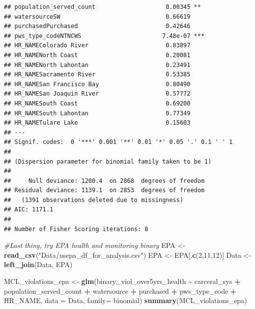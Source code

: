 \documentclass[
]{article}
\newenvironment{Shaded}{\begin{snugshade}}{\end{snugshade}}
\newcommand{\AttributeTok}[1]{\textcolor[rgb]{0.13,0.29,0.53}{#1}}
\newcommand{\CommentTok}[1]{\textcolor[rgb]{0.56,0.35,0.01}{\textit{#1}}}
\newcommand{\DecValTok}[1]{\textcolor[rgb]{0.00,0.00,0.81}{#1}}
\newcommand{\FunctionTok}[1]{\textcolor[rgb]{0.13,0.29,0.53}{\textbf{#1}}}
\newcommand{\NormalTok}[1]{#1}
\newcommand{\OtherTok}[1]{\textcolor[rgb]{0.56,0.35,0.01}{#1}}
\newcommand{\SpecialCharTok}[1]{\textcolor[rgb]{0.81,0.36,0.00}{\textbf{#1}}}
\newcommand{\StringTok}[1]{\textcolor[rgb]{0.31,0.60,0.02}{#1}}
\begin{document}
\begin{verbatim}
## population_served_count                    0.00345 ** 
## watersourceSW                              0.66619    
## purchasedPurchased                         0.42646    
## pws_type_codeNTNCWS                       7.48e-07 ***
## HR_NAMEColorado River                      0.83897    
## HR_NAMENorth Coast                         0.20081    
## HR_NAMENorth Lahontan                      0.23491    
## HR_NAMESacramento River                    0.53385    
## HR_NAMESan Francisco Bay                   0.80490    
## HR_NAMESan Joaquin River                   0.57772    
## HR_NAMESouth Coast                         0.69200    
## HR_NAMESouth Lahontan                      0.77349    
## HR_NAMETulare Lake                         0.15603    
## ---
## Signif. codes:  0 '***' 0.001 '**' 0.01 '*' 0.05 '.' 0.1 ' ' 1
## 
## (Dispersion parameter for binomial family taken to be 1)
## 
##     Null deviance: 1200.4  on 2868  degrees of freedom
## Residual deviance: 1139.1  on 2853  degrees of freedom
##   (1391 observations deleted due to missingness)
## AIC: 1171.1
## 
## Number of Fisher Scoring iterations: 8
\end{verbatim}

\begin{Shaded}
\begin{Highlighting}[]
\CommentTok{\#Last thing, try EPA health and monitoring binary}
\NormalTok{EPA }\OtherTok{\textless{}{-}} \FunctionTok{read\_csv}\NormalTok{(}\StringTok{"Data/usepa\_df\_for\_analysis.csv"}\NormalTok{)}
\NormalTok{EPA }\OtherTok{\textless{}{-}}\NormalTok{ EPA[,}\FunctionTok{c}\NormalTok{(}\DecValTok{2}\NormalTok{,}\DecValTok{11}\NormalTok{,}\DecValTok{12}\NormalTok{)]}
\NormalTok{Data }\OtherTok{\textless{}{-}} \FunctionTok{left\_join}\NormalTok{(Data, EPA)}

\NormalTok{MCL\_violations\_epa }\OtherTok{\textless{}{-}} \FunctionTok{glm}\NormalTok{(binary\_viol\_over5yrs\_health }\SpecialCharTok{\textasciitilde{}}\NormalTok{ carceral\_sys }\SpecialCharTok{+}\NormalTok{ population\_served\_count }\SpecialCharTok{+}\NormalTok{ watersource }\SpecialCharTok{+}\NormalTok{ purchased }\SpecialCharTok{+}\NormalTok{ pws\_type\_code }\SpecialCharTok{+}\NormalTok{ HR\_NAME, }\AttributeTok{data =}\NormalTok{ Data, }\AttributeTok{family=}\NormalTok{ binomial)}
\FunctionTok{summary}\NormalTok{(MCL\_violations\_epa)}
\end{Highlighting}
\end{Shaded}
\end{document}
